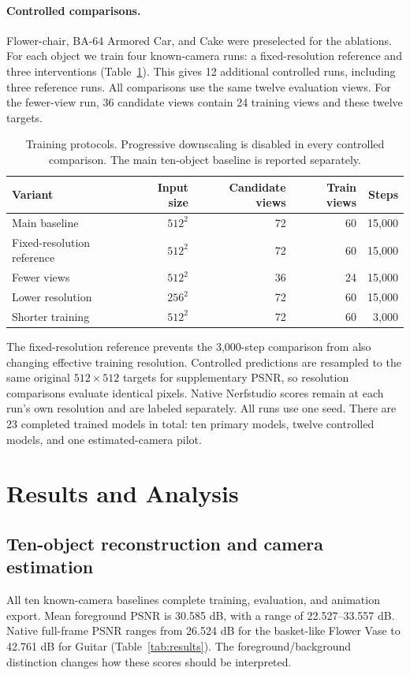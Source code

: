 \documentclass{article}
\begin{document}
\paragraph{Controlled comparisons.}
Flower-chair, BA-64 Armored Car, and Cake were preselected for the ablations. For each object we train four known-camera runs: a fixed-resolution reference and three interventions (Table~\ref{tab:protocol}). This gives 12 additional controlled runs, including three reference runs. All comparisons use the same twelve evaluation views. For the fewer-view run, 36 candidate views contain 24 training views and these twelve targets.

\begin{table}[t]
\caption{Training protocols. Progressive downscaling is disabled in every controlled comparison. The main ten-object baseline is reported separately.}
\label{tab:protocol}\centering\small
\begin{tabular}{lrrrr}
\toprule
Variant & Input size & Candidate views & Train views & Steps\\
\midrule
Main baseline & $512^2$ & 72 & 60 & 15,000\\
Fixed-resolution reference & $512^2$ & 72 & 60 & 15,000\\
Fewer views & $512^2$ & 36 & 24 & 15,000\\
Lower resolution & $256^2$ & 72 & 60 & 15,000\\
Shorter training & $512^2$ & 72 & 60 & 3,000\\
\bottomrule
\end{tabular}
\end{table}

The fixed-resolution reference prevents the 3,000-step comparison from also changing effective training resolution. Controlled predictions are resampled to the same original $512\times512$ targets for supplementary PSNR, so resolution comparisons evaluate identical pixels. Native Nerfstudio scores remain at each run's own resolution and are labeled separately. All runs use one seed. There are 23 completed trained models in total: ten primary models, twelve controlled models, and one estimated-camera pilot.

\section{Results and Analysis}
\subsection{Ten-object reconstruction and camera estimation}
All ten known-camera baselines complete training, evaluation, and animation export. Mean foreground PSNR is 30.585 dB, with a range of 22.527--33.557 dB. Native full-frame PSNR ranges from 26.524 dB for the basket-like Flower Vase to 42.761 dB for Guitar (Table~\ref{tab:results}). The foreground/background distinction changes how these scores should be interpreted.
\end{document}
